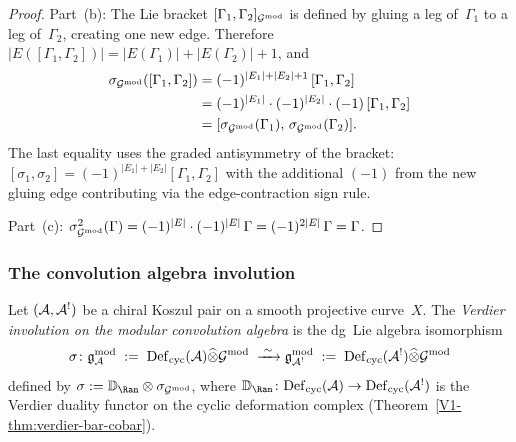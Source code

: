 \begin{proof}
Part~(b): The Lie bracket $[\Gamma_1, \Gamma_2]_{\mathcal{G}^{\mathrm{mod}}}$ is
defined by gluing a leg of~$\Gamma_1$ to a leg of~$\Gamma_2$,
creating one new edge. Therefore
$|E([\Gamma_1, \Gamma_2])| = |E(\Gamma_1)| + |E(\Gamma_2)| + 1$,
and
\begin{align*}
\sigma_{\mathcal{G}^{\mathrm{mod}}}([\Gamma_1, \Gamma_2])
&= (-1)^{|E_1|+|E_2|+1}\,[\Gamma_1, \Gamma_2] \\
&= (-1)^{|E_1|} \cdot (-1)^{|E_2|} \cdot (-1)\,[\Gamma_1, \Gamma_2] \\
&= [\sigma_{\mathcal{G}^{\mathrm{mod}}}(\Gamma_1),\, \sigma_{\mathcal{G}^{\mathrm{mod}}}(\Gamma_2)].
\end{align*}
The last equality uses the graded antisymmetry of the bracket:
$[\sigma_1, \sigma_2] = (-1)^{|E_1|+|E_2|}[\Gamma_1, \Gamma_2]$
with the additional $(-1)$ from the new gluing edge contributing via the
edge-contraction sign rule.

Part~(c): $\sigma_{\mathcal{G}^{\mathrm{mod}}}^2(\Gamma) = (-1)^{|E|} \cdot (-1)^{|E|}\,\Gamma
= (-1)^{2|E|}\,\Gamma = \Gamma$.
\end{proof}

\subsubsection{The convolution algebra involution}

\begin{definition}
\label{def:thqg-IV-verdier-convolution}
Let $(\mathcal{A}, \mathcal{A}^!)$ be a chiral Koszul pair on a smooth projective
curve~$X$. The \emph{Verdier involution on the modular
convolution algebra} is the dg~Lie algebra isomorphism
\begin{equation}%
\sigma\colon
\gAmod
\;:=\;
\Defcyc(\cA) \widehat{\otimes} \Gmod
\;\xrightarrow{\;\sim\;}
\mathfrak{g}_{\cA^!}^{\mathrm{mod}}
\;:=\;
\Defcyc(\cA^!) \widehat{\otimes} \Gmod
\end{equation}
defined by
$\sigma := \VD_{\Ran} \otimes \sigma_{\Gmod}$,
where $\VD_{\Ran}\colon \Defcyc(\cA) \to \Defcyc(\cA^!)$ is the
Verdier duality functor on the cyclic deformation complex
(Theorem~\ref*{V1-thm:verdier-bar-cobar}).
\end{definition}

